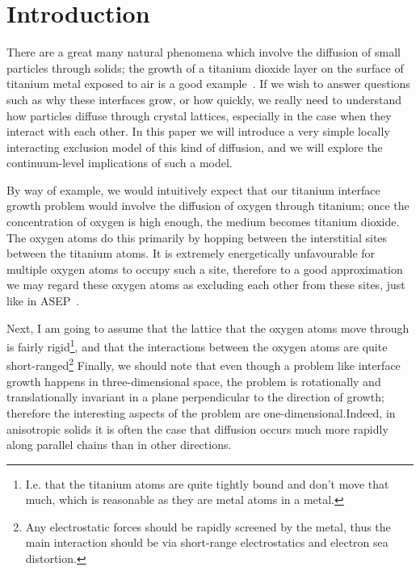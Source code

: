 \section{Introduction}
There are a great many natural phenomena which involve the diffusion of small particles through solids; the growth of a titanium dioxide layer on the surface of titanium metal exposed to air is a good example~\cite{tegner2015high}.
If we wish to answer questions such as why these interfaces grow, or how quickly, we really need to understand how particles diffuse through crystal lattices, especially in the case when they interact with each other.
In this paper we will introduce a very simple locally interacting exclusion model of this kind of diffusion, and we will explore the continuum-level implications of such a model.

By way of example, we would intuitively expect that our titanium interface growth problem would involve the diffusion of oxygen through titanium; once the concentration of oxygen is high enough, the medium becomes titanium dioxide.
The oxygen atoms do this primarily by hopping between the interstitial sites between the titanium atoms.
It is extremely energetically unfavourable for multiple oxygen atoms to occupy such a site,
therefore to a good approximation we may regard these oxygen atoms as excluding each other from these sites, just like in ASEP~\cite{sugden2007dynamically, liggett1985interacting}.

Next, I am going to assume that the lattice that the oxygen atoms move through is fairly rigid\footnote{I.e. that the titanium atoms are quite tightly bound and don't move that much, which is reasonable as they are metal atoms in a metal.},
and that the interactions between the oxygen atoms are quite short-ranged\footnote{Any electrostatic forces should be rapidly screened by the metal, thus the main interaction should be via short-range electrostatics and electron sea distortion.}
Finally, we should note that even though a problem like interface growth happens in three-dimensional space, the problem is rotationally and translationally invariant in a plane perpendicular to the direction of growth; therefore the
interesting aspects of the problem are one-dimensional.Indeed, in anisotropic solids it is often the case that diffusion occurs much more rapidly along parallel chains than in other directions.

